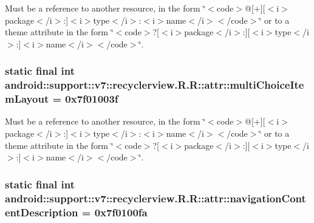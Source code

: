 Must be a reference to another resource, in the form \char`\"{}$<$code$>$@\mbox{[}+\mbox{]}\mbox{[}$<$i$>$package$<$/i$>$:\mbox{]}$<$i$>$type$<$/i$>$:$<$i$>$name$<$/i$>$$<$/code$>$\char`\"{} or to a theme attribute in the form \char`\"{}$<$code$>$?\mbox{[}$<$i$>$package$<$/i$>$:\mbox{]}\mbox{[}$<$i$>$type$<$/i$>$:\mbox{]}$<$i$>$name$<$/i$>$$<$/code$>$\char`\"{}. \hypertarget{classandroid_1_1support_1_1v7_1_1recyclerview_1_1_r_1_1attr_512ccde6eaef8ff04f623eb0e1a963e5}{
\subsubsection[{multiChoiceItemLayout}]{\setlength{\rightskip}{0pt plus 5cm}static final int android::support::v7::recyclerview.R.R::attr::multiChoiceItemLayout = 0x7f01003f}}
\label{classandroid_1_1support_1_1v7_1_1recyclerview_1_1_r_1_1attr_512ccde6eaef8ff04f623eb0e1a963e5}


Must be a reference to another resource, in the form \char`\"{}$<$code$>$@\mbox{[}+\mbox{]}\mbox{[}$<$i$>$package$<$/i$>$:\mbox{]}$<$i$>$type$<$/i$>$:$<$i$>$name$<$/i$>$$<$/code$>$\char`\"{} or to a theme attribute in the form \char`\"{}$<$code$>$?\mbox{[}$<$i$>$package$<$/i$>$:\mbox{]}\mbox{[}$<$i$>$type$<$/i$>$:\mbox{]}$<$i$>$name$<$/i$>$$<$/code$>$\char`\"{}. \hypertarget{classandroid_1_1support_1_1v7_1_1recyclerview_1_1_r_1_1attr_f9c4936c17c7bf81d4b083413d5dfe25}{
\subsubsection[{navigationContentDescription}]{\setlength{\rightskip}{0pt plus 5cm}static final int android::support::v7::recyclerview.R.R::attr::navigationContentDescription = 0x7f0100fa}}
\label{classandroid_1_1support_1_1v7_1_1recyclerview_1_1_r_1_1attr_f9c4936c17c7bf81d4b083413d5dfe25}


